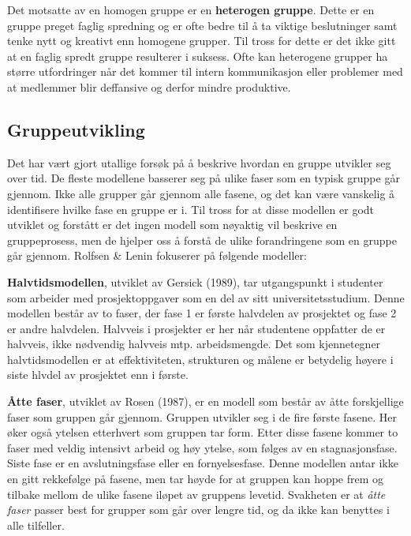 Det motsatte av en homogen gruppe er en \textbf{heterogen gruppe}. 
Dette er en gruppe preget faglig spredning og er ofte bedre til å ta viktige beslutninger samt tenke nytt og kreativt enn homogene grupper. 
Til tross for dette er det ikke gitt at en faglig spredt gruppe resulterer i suksess. 
Ofte kan heterogene grupper ha større utfordringer når det kommer til intern kommunikasjon eller problemer med at medlemmer blir deffansive og derfor mindre produktive. 

\subsection{Gruppeutvikling}
Det har vært gjort utallige forsøk på å beskrive hvordan en gruppe utvikler seg over tid. 
De fleste modellene basserer seg på ulike faser som en typisk gruppe går gjennom. 
Ikke alle grupper går gjennom alle fasene, og det kan være vanskelig å identifisere hvilke fase en gruppe er i.
Til tross for at disse modellen er godt utviklet og forstått er det ingen modell som nøyaktig vil beskrive en gruppeprosess, men de hjelper oss å forstå de ulike forandringene som en gruppe går gjennom. 
Rolfsen \& Lenin fokuserer på følgende modeller:

\textbf{Halvtidsmodellen}, utviklet av Gersick (1989), tar utgangspunkt i studenter som arbeider med prosjektoppgaver som en del av sitt universitetsstudium.
Denne modellen består av to faser, der fase 1 er første halvdelen av prosjektet og fase 2 er andre halvdelen. 
Halvveis i prosjekter er her når studentene oppfatter de er halvveis, ikke nødvendig halvveis mtp. arbeidsmengde. 
Det som kjennetegner halvtidsmodellen er at effektiviteten, strukturen og målene er betydelig høyere i siste hlvdel av prosjektet enn i første. 

\textbf{Åtte faser}, utviklet av Rosen (1987), er en modell som består av åtte forskjellige faser som gruppen går gjennom.
Gruppen utvikler seg i de fire første fasene. Her øker også ytelsen etterhvert som gruppen tar form.
Etter disse fasene kommer to faser med veldig intensivt arbeid og høy ytelse, som følges av en stagnasjonsfase. 
Siste fase er en avslutningsfase eller en fornyelsesfase.
Denne modellen antar ikke en gitt rekkefølge på fasene, men tar høyde for at gruppen kan hoppe frem og tilbake mellom de ulike fasene iløpet av gruppens levetid. 
Svakheten er at \textit{åtte faser} passer best for grupper som går over lengre tid, og da ikke kan benyttes i alle tilfeller. 

